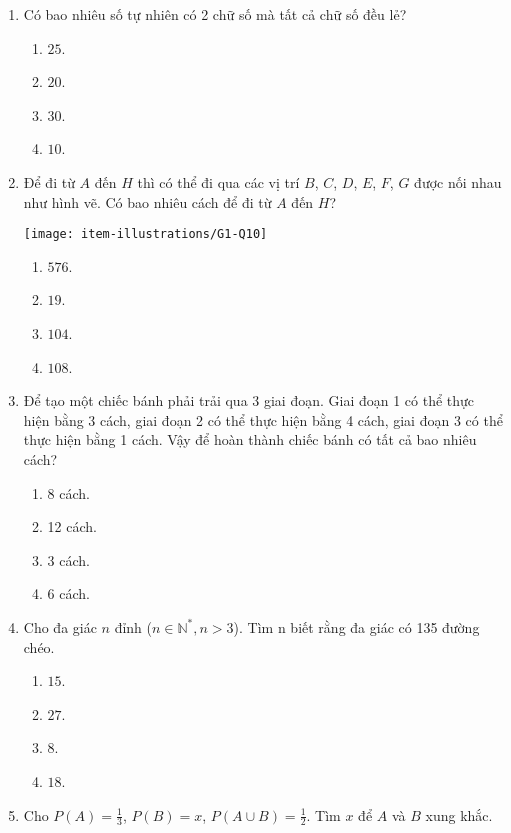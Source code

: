 \begin{enumerate}[label=\textbf{Câu \arabic*.},align=left,left=0cm..0cm,itemindent=*]
\begin{enumerate}[label=\textbf{\Alph*.},align=left,left=1cm..0cm,itemindent=*]
	\end{enumerate}
	\item Có bao nhiêu số tự nhiên có 2 chữ số mà tất cả chữ số đều lẻ?
	\begin{enumerate}[label=\textbf{\Alph*.},align=left,left=1cm..0cm,itemindent=*]
		\item $25$. \item $20$. \item $30$. \item $10$.
	\end{enumerate}
	\item Để đi từ $A$ đến $H$ thì có thể đi qua các vị trí $B$, $C$, $D$, $E$, $F$, $G$ được nối nhau như hình vẽ. Có bao nhiêu cách để đi từ $A$ đến $H$?\par
	{\centering\texttt{[image: item-illustrations/G1-Q10]}\par}
	\begin{enumerate}[label=\textbf{\Alph*.},align=left,left=1cm..0cm,itemindent=*]
		\item $576$. \item $19$. \item $104$. \item $108$.
	\end{enumerate}
	\item Để tạo một chiếc bánh phải trải qua 3 giai đoạn. Giai đoạn 1 có thể thực hiện bằng 3 cách, giai đoạn 2 có thể thực hiện bằng 4 cách, giai đoạn 3 có thể thực hiện bằng 1 cách. Vậy để hoàn thành chiếc bánh có tất cả bao nhiêu cách?
	\begin{enumerate}[label=\textbf{\Alph*.},align=left,left=1cm..0cm,itemindent=*]
		\item 8 cách. \item 12 cách. \item 3 cách. \item 6 cách.
	\end{enumerate}
	\item Cho đa giác $n$ đỉnh ($n\in \mathbb{N}^{*},n>3$). Tìm n biết rằng đa giác có 135 đường chéo.
	\begin{enumerate}[label=\textbf{\Alph*.},align=left,left=1cm..0cm,itemindent=*]
		\item $15$. \item $27$. \item $8$. \item $18$.
	\end{enumerate}
	\item Cho $P(A)=\frac 13$, $P(B)=x$, $P(A\cup B)=\frac 12$. Tìm $x$ để $A$ và $B$ xung khắc.

\end{enumerate}
